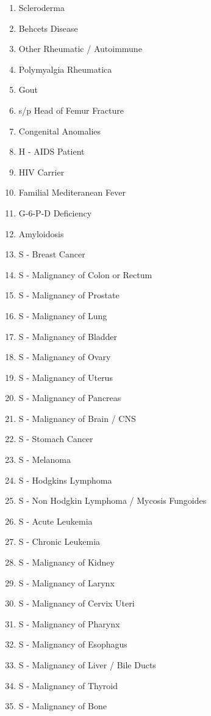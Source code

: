 \documentclass[a4paper,12pt]{article}
\begin{document}
\begin{appendices}
\begin{enumerate}
   			\item Scleroderma
   			\item Behcets Disease
   			\item Other Rheumatic / Autoimmune
   			\item Polymyalgia Rheumatica
   			\item Gout
   			\item s/p Head of Femur Fracture
   			\item Congenital Anomalies
   			\item H - AIDS Patient
   			\item HIV Carrier
   			\item Familial Mediteranean Fever
   			\item G-6-P-D Deficiency
   			\item Amyloidosis
   			\item S - Breast Cancer
   			\item S - Malignancy of Colon or Rectum
   			\item S - Malignancy of Prostate
   			\item S - Malignancy of Lung
   			\item S - Malignancy of Bladder
   			\item S - Malignancy of Ovary
   			\item S - Malignancy of Uterus
   			\item S - Malignancy of Pancreas
   			\item S - Malignancy of Brain / CNS
   			\item S - Stomach Cancer
   			\item S - Melanoma
   			\item S - Hodgkins Lymphoma
   			\item S - Non Hodgkin Lymphoma / Mycosis Fungoides
   			\item S - Acute Leukemia
   			\item S - Chronic Leukemia
   			\item S - Malignancy of Kidney
   			\item S - Malignancy of Larynx
   			\item S - Malignancy of Cervix Uteri
   			\item S - Malignancy of Pharynx
   			\item S - Malignancy of Esophagus
   			\item S - Malignancy of Liver / Bile Ducts
   			\item S - Malignancy of Thyroid
   			\item S - Malignancy of Bone

\end{enumerate}
\end{appendices}
\end{document}
